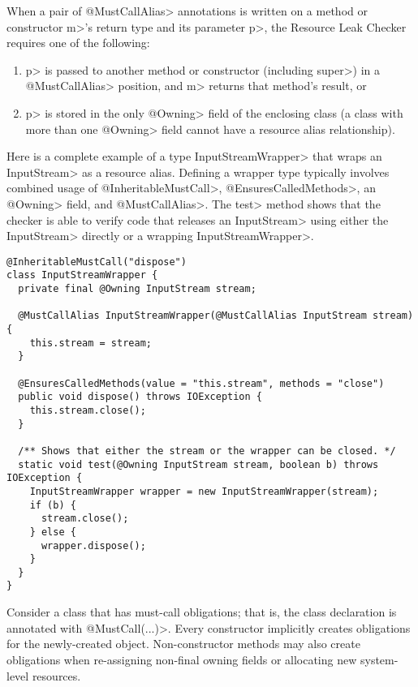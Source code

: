 When a pair of \<@MustCallAlias> annotations is written on a method or constructor \<m>'s return type
and its parameter \<p>, the Resource Leak Checker requires one of the following:
\begin{enumerate}
\item \<p> is passed to another method or constructor (including \<super>) in a
  \<@MustCallAlias> position, and \<m> returns that method's result, or
\item \<p> is stored in the only \<@Owning> field of the enclosing class (a class with more than one
  \<@Owning> field cannot have a resource alias relationship).
\end{enumerate}


Here is a complete example of a type \<InputStreamWrapper> that wraps an \<InputStream> as a resource alias.  Defining a wrapper type typically involves combined usage of \<@InheritableMustCall>, \<@EnsuresCalledMethods>, an \<@Owning> field, and \<@MustCallAlias>.  The \<test> method shows that the checker is able to verify code that releases an \<InputStream> using either the \<InputStream> directly or a wrapping \<InputStreamWrapper>.

\begin{verbatim}
@InheritableMustCall("dispose")
class InputStreamWrapper {
  private final @Owning InputStream stream;

  @MustCallAlias InputStreamWrapper(@MustCallAlias InputStream stream) {
    this.stream = stream;
  }

  @EnsuresCalledMethods(value = "this.stream", methods = "close")
  public void dispose() throws IOException {
    this.stream.close();
  }

  /** Shows that either the stream or the wrapper can be closed. */
  static void test(@Owning InputStream stream, boolean b) throws IOException {
    InputStreamWrapper wrapper = new InputStreamWrapper(stream);
    if (b) {
      stream.close();
    } else {
      wrapper.dispose();
    }
  }
}
\end{verbatim}



Consider a class that has must-call obligations; that is, the class
declaration is annotated with \<@MustCall(...)>.
Every constructor implicitly creates obligations for the newly-created object.
Non-constructor methods may also create obligations
when re-assigning non-final owning fields or allocating
new system-level resources.

